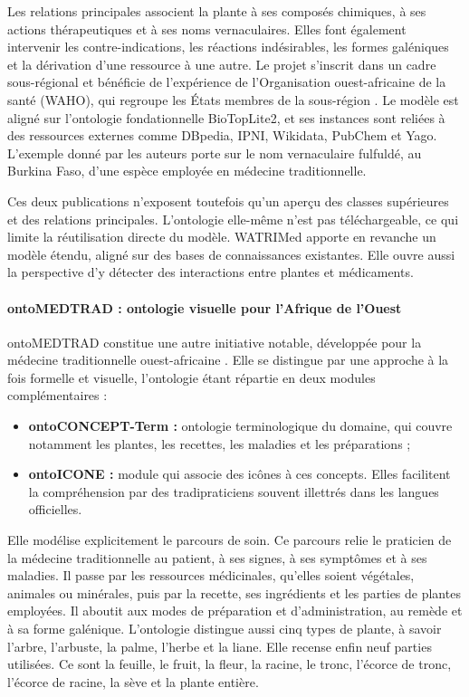 Les relations principales associent la plante à ses composés chimiques, à ses actions thérapeutiques et à ses noms vernaculaires. Elles font également intervenir les contre-indications, les réactions indésirables, les formes galéniques et la dérivation d'une ressource à une autre. Le projet s'inscrit dans un cadre sous-régional et bénéficie de l'expérience de l'Organisation ouest-africaine de la santé (WAHO), qui regroupe les États membres de la sous-région \cite{watrimed_design_2019}. Le modèle est aligné sur l'ontologie fondationnelle BioTopLite2, et ses instances sont reliées à des ressources externes comme DBpedia, IPNI, Wikidata, PubChem et Yago. L'exemple donné par les auteurs porte sur le nom vernaculaire fulfuldé, au Burkina Faso, d'une espèce employée en médecine traditionnelle.

Ces deux publications n'exposent toutefois qu'un aperçu des classes supérieures et des relations principales. L'ontologie elle-même n'est pas téléchargeable, ce qui limite la réutilisation directe du modèle. WATRIMed apporte en revanche un modèle étendu, aligné sur des bases de connaissances existantes. Elle ouvre aussi la perspective d'y détecter des interactions entre plantes et médicaments.

\paragraph{ontoMEDTRAD : ontologie visuelle pour l'Afrique de l'Ouest}

ontoMEDTRAD constitue une autre initiative notable, développée pour la médecine traditionnelle ouest-africaine \cite{kouame_systeme_2018}. Elle se distingue par une approche à la fois formelle et visuelle, l'ontologie étant répartie en deux modules complémentaires :
\begin{itemize}[label={$\bullet$}, leftmargin=1cm]
    \item \textbf{ontoCONCEPT-Term :} ontologie terminologique du domaine, qui couvre notamment les plantes, les recettes, les maladies et les préparations ;
    \item \textbf{ontoICONE :} module qui associe des icônes à ces concepts. Elles facilitent la compréhension par des tradipraticiens souvent illettrés dans les langues officielles.
\end{itemize}

Elle modélise explicitement le parcours de soin. Ce parcours relie le praticien de la médecine traditionnelle au patient, à ses signes, à ses symptômes et à ses maladies. Il passe par les ressources médicinales, qu'elles soient végétales, animales ou minérales, puis par la recette, ses ingrédients et les parties de plantes employées. Il aboutit aux modes de préparation et d'administration, au remède et à sa forme galénique. L'ontologie distingue aussi cinq types de plante, à savoir l'arbre, l'arbuste, la palme, l'herbe et la liane. Elle recense enfin neuf parties utilisées. Ce sont la feuille, le fruit, la fleur, la racine, le tronc, l'écorce de tronc, l'écorce de racine, la sève et la plante entière.

